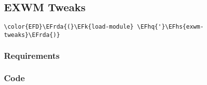 \documentclass[a4wide,10pt]{article}
\newcommand{\EFk}[1]{\textcolor{EFk}{#1}} %
\newcommand{\EFhq}[1]{\textcolor{EFhq}{#1}} %
\newcommand{\EFhs}[1]{\textcolor{EFhs}{#1}} %
\newcommand{\EFrda}[1]{\textcolor{EFrda}{#1}} %
\begin{document}
\subsection{EXWM Tweaks}
\label{sec:org0ab8454}
\begin{Code}
\begin{Verbatim}
\color{EFD}\EFrda{(}\EFk{load-module} \EFhq{'}\EFhs{exwm-tweaks}\EFrda{)}
\end{Verbatim}
\end{Code}
\subsubsection{Requirements}
\label{sec:org7d8f9cb}
\subsubsection{Code}
\label{sec:orgfe4fe81}
\end{document}
